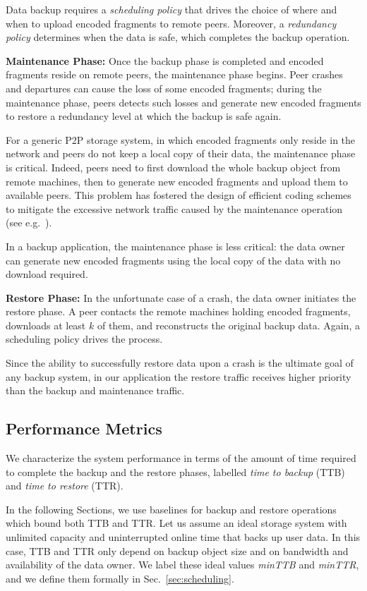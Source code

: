 \documentclass[conference,10pt]{IEEEtran}
\begin{document}
Data backup requires a \emph{scheduling policy} that drives the choice
of where and when to upload encoded fragments to remote
peers. Moreover, a \emph{redundancy policy} determines when the data is safe, which completes the backup operation.


\noindent \textbf{Maintenance Phase:} Once the backup phase is
completed and encoded fragments reside on remote peers, the
maintenance phase begins. Peer crashes and departures can cause the
loss of some encoded fragments; during the maintenance phase, peers
detects such losses and generate new encoded fragments to restore a
redundancy level at which the backup is safe again.

For a generic P2P storage system, in which encoded fragments only
reside in the network and peers do not keep a local copy of their
data, the maintenance phase is critical. Indeed, peers need to first
download the whole backup object from remote machines, then to
generate new encoded fragments and upload them to available
peers. This problem has fostered the design of efficient coding
schemes to mitigate the excessive network traffic caused by the
maintenance operation (see
e.g.~\cite{dimakis07,duminuco-biersack-08}).

In a backup application, the maintenance phase is less critical: the
data owner can generate new encoded fragments using the local copy of
the data with no download required.

\noindent \textbf{Restore Phase: } In the unfortunate case of a
crash, the data owner initiates the restore phase. A peer contacts the
remote machines holding encoded fragments, downloads at least $k$ of
them, and reconstructs the original backup data. Again, a scheduling
policy drives the process.

Since the ability to successfully restore data upon a crash is the
ultimate goal of any backup system, in our application the restore
traffic receives higher priority than the backup and maintenance
traffic.

\subsection{Performance Metrics}

We characterize the system performance in terms of the amount of time
required to complete the backup and the restore phases,
labelled \emph{time to backup} (TTB) and \emph{time to restore}
(TTR). 

In the following Sections, we use baselines for backup and restore
operations which bound both TTB and TTR. Let us assume an ideal
storage system with unlimited capacity and uninterrupted online time
that backs up user data. In this case, TTB and TTR only depend on
backup object size and on bandwidth and availability of the data
owner. We label these ideal values \emph{minTTB} and \emph{minTTR},
and we define them formally in Sec.~\ref{sec:scheduling}.
\end{document}
